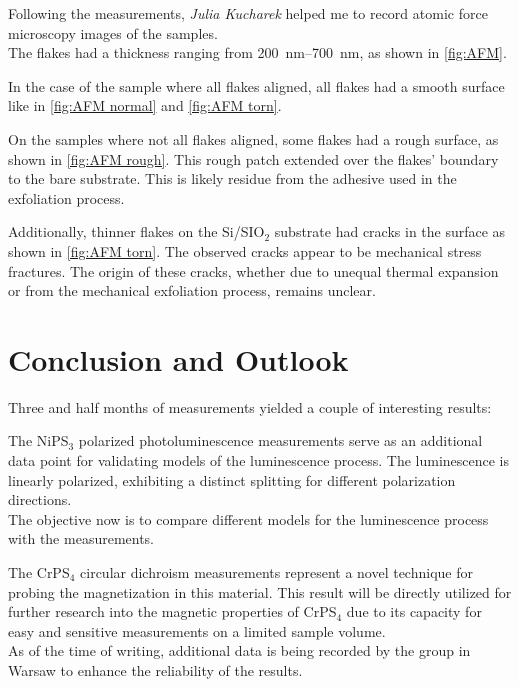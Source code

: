 \documentclass[
	oneside,
	parskip=half,
	a4paper,
]{scrbook}
\begin{document}
Following the measurements, \textit{Julia Kucharek} helped me to record atomic force microscopy images of the samples.\\
The flakes had a thickness ranging from \SIrange{200}{700}{nm}, as shown in \autoref{fig:AFM}.

In the case of the sample where all flakes aligned, all flakes had a smooth surface like in \autoref{fig:AFM normal} and \autoref{fig:AFM torn}.

On the samples where not all flakes aligned, some flakes had a rough surface, as shown in \autoref{fig:AFM rough}.
This rough patch extended over the flakes' boundary to the bare substrate.
This is likely residue from the adhesive used in the exfoliation process.

Additionally, thinner flakes on the Si/SIO$_2$ substrate had cracks in the surface as shown in \autoref{fig:AFM torn}.
The observed cracks appear to be mechanical stress fractures.
The origin of these cracks, whether due to unequal thermal expansion or from the mechanical exfoliation process, remains unclear. 



\chapter{Conclusion and Outlook}
Three and half months of measurements yielded a couple of interesting results:

The NiPS$_3$ polarized photoluminescence measurements serve as an additional data point for validating models of the luminescence process.
The luminescence is linearly polarized, exhibiting a distinct splitting for different polarization directions.\\
The objective now is to compare different models for the luminescence process \cite{NiPS3_coherent, MPX_first_principles} with the measurements. 

The CrPS$_4$ circular dichroism measurements represent a novel technique for probing the magnetization in this material.
This result will be directly utilized for further research into the magnetic properties of CrPS$_4$ due to its capacity for easy and sensitive measurements on a limited sample volume.\\
As of the time of writing, additional data is being recorded by the group in Warsaw to enhance the reliability of the results.
\end{document}
